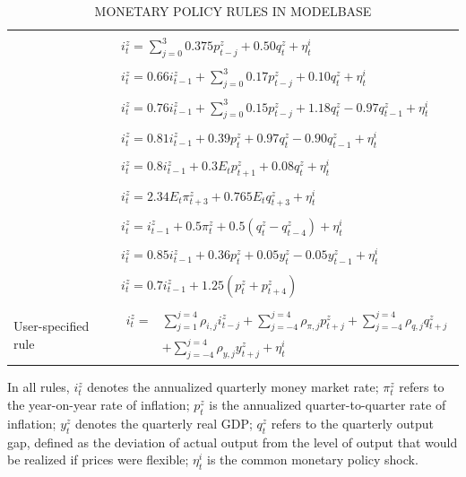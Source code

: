 \documentclass[11pt,a4paper]{article}
\begin{document}
\begin{table}[H]
\caption{\textsc{MONETARY POLICY RULES IN MODELBASE}}
\vspace{.2cm}
\label{tab:PolicyRules}
\begin{tabularx}{\textwidth}{ll}
\hline
&\\
\cite{Taylor1993}                  & $i_{t}^{z} = \sum_{j=0}^3 0.375 p_{t-j}^{z} +0.50 q_{t}^{z} +\eta_{t}^{i} $  \\
&\\
\cite{GerdesmeierRoffia2004}       & $i_{t}^{z} = 0.66 i_{t-1}^{z} +\sum_{j=0}^3 0.17 p_{t-j}^{z} + 0.10 q_{t}^{z} +\eta_{t}^{i}$  \\
&\\
\cite{LevinWielandWilliams2003}    & $i_{t}^{z} = 0.76 i_{t-1}^{z} +\sum_{j=0}^3 0.15 p_{t-j}^{z} +1.18 q_{t}^{z}-0.97 q_{t-1}^{z} +\eta_{t}^{i}$ \\
&\\
\cite{SmetsWouters2007}            & $i_{t}^{z} = 0.81 i_{t-1}^{z} +0.39 p_{t}^{z} +0.97 q_{t}^{z} -0.90 q_{t-1}^{z} +\eta_{t}^{i}$  \\
&\\
\cite{ChristianoEichenbaumEvans2005} & $i_{t}^{z} = 0.8 i_{t-1}^{z} +0.3 E_{t}p_{t+1}^{z} +0.08q_{t}^{z} +\eta_{t}^{i}$ \\
&\\
\cite{OrphanidesWieland2008} & $i_{t}^{z} = 2.34 E_{t}\pi_{t+3}^{z} +0.765 E_{t}q_{t+3}^{z} +\eta_{t}^{i}$ \\
&\\
\cite{OrphanidesWieland2013} & $i_{t}^{z} = i_{t-1}^{z} +0.5 \pi_{t}^{z} +0.5(q_{t}^{z}-q_{t-4}^{z}) +\eta_{t}^{i}$ \\
 &\\
\cite{CMR2014} & $i_{t}^{z} = 0.85 i_{t-1}^{z} +0.36 p_{t}^{z} + 0.05 y_{t}^{z} - 0.05 y_{t-1}^{z} +\eta_{t}^{i}$\\
&\\
\cite{Coenenetal2012} & $i_{t}^{z} = 0.7 i_{t-1}^{z} +1.25(p_{t}^{z}+ p_{t+4}^{z})$\\
&\\
User-specified rule    &{$\!\begin{aligned} 
                         i_{t}^{z} =& {\sum}_{j=1}^{j=4}\rho_{i,j}i_{t-j}^{z} +{\sum}_{j=-4}^{j=4}\rho_{\pi,j}p_{t+j}^{z} +{\sum}_{j=-4}^{j=4}\rho_{q,j}q_{t+j}^{z}\\ 
								          &+{\sum}_{j=-4}^{j=4}\rho_{y,j}y_{t+j}^{z} +\eta_{t}^{i}
								\end{aligned}$}\\
\hline
\end{tabularx}
\end{table}
\noindent In all rules, $i_t^z $ denotes the annualized quarterly money market rate; $\pi_t^z$ refers to the year-on-year rate of inflation; $ p_t^z$ is the annualized quarter-to-quarter rate of inflation; $y_t^z $ denotes the quarterly real GDP; $ q_t^z$ refers to the quarterly output gap, defined as the deviation of actual output from the level of output that would be realized if prices were flexible; $\eta_{t}^{i} $ is the common monetary policy shock.\\
\end{document}
